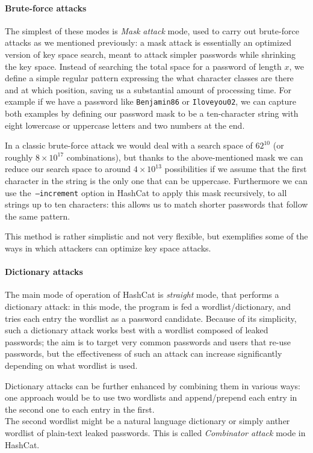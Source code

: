 \paragraph{Brute-force attacks}\label{par:brute-force}
The simplest of these modes is \emph{Mask attack} mode, used to carry out brute-force attacks as we mentioned previously: a mask attack is essentially an optimized version of key space search, meant to attack simpler passwords while shrinking the key space. 
Instead of searching the total space for a password of length $x$, we define a simple regular pattern expressing the what character classes are there and at which position, saving us a substantial amount of processing time.
For example if we have a password like \texttt{Benjamin86} or \texttt{Iloveyou02}, we can capture both examples by defining our password mask to be a ten-character string with eight lowercase or uppercase letters and two numbers at the end.

In a classic brute-force attack we would deal with a search space of $62^{10}$ (or roughly $8 \times 10^{17}$ combinations), but thanks to the above-mentioned mask we can reduce our search space to around $4 \times 10^{13}$ possibilities if we assume that the first character in the string is the only one that can be uppercase.
Furthermore we can use \mbox{the \texttt{--increment}} option in HashCat to apply this mask recursively, to all strings up to ten characters: this allows us to match shorter passwords that follow the same pattern.

This method is rather simplistic and not very flexible, but exemplifies some of the ways in which attackers can optimize key space attacks.

\paragraph{Dictionary attacks}
The main mode of operation of HashCat is \emph{straight} mode, that performs a dictionary attack: in this mode, the program is fed a wordlist/dictionary, and tries each entry the wordlist as a password candidate. Because of its simplicity, such a dictionary attack works best with a wordlist composed of leaked passwords; the aim is to target very common passwords and users that re-use passwords, but the effectiveness of such an attack can increase significantly depending on what wordlist is used.

Dictionary attacks can be further enhanced by combining them in various ways: one approach would be to use two wordlists and append/prepend each entry in the second one to each entry in the first.\\ 
The second wordlist might be a natural language dictionary or simply anther wordlist of plain-text leaked passwords. This is called \emph{Combinator attack} mode in HashCat. 

